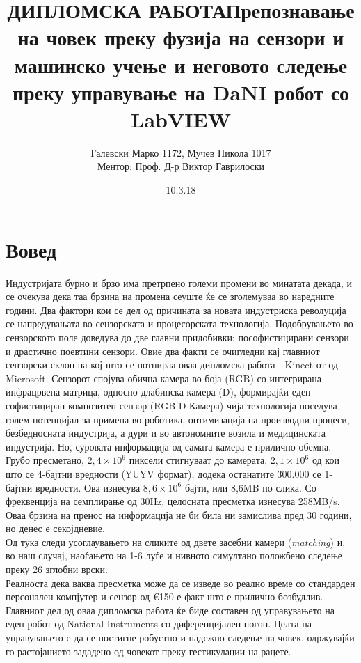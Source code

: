 \documentclass[12pt]{article}
\title{ДИПЛОМСКА РАБОТА\bigbreak \textbf{Препознавање на човек преку фузија на сензори и машинско учење и неговото следење
				преку управување на DaNI робот со LabVIEW}}
\date{10.3.18}
\author{Галевски Марко 1172, Мучев Никола 1017	\\	Ментор: Проф. Д-р Виктор Гаврилоски}
\begin{document}
    \sloppy
    \maketitle{}
    \newpage
    \tableofcontents
    \newpage
\section{Вовед}
  Индустријата бурно и брзо има претрпено големи промени во минатата декада, и се очекува дека таа брзина на промена сеуште ќе се зголемуваа во наредните години. Два фактори кои се дел од причината за новата индустриска револуција се напредувањата во сензорската и процесорската технологија.\bigbreak
  Подобрувањето во сензорското поле доведува до две главни придобивки: пософистицирани сензори и драстично поевтини сензори. Овие два факти се очигледни кај главниот сензорски склоп на кој што се потпираа оваа дипломска работа - Kinect-от од Microsoft. Сензорот спојува обична камера во боја (RGB) со интегрирана инфрацрвена матрица, односно длабинска камера (D), формирајќи еден софистициран композитен сензор (RGB-D Камера) чија технологија поседува голем потенцијал за примена во роботика, оптимизација на производни процеси, безбедносната индустрија, а дури и во автономните возила и медицинската индустрија.
  \bigbreak
  Но, суровата информација од самата камера е прилично обемна. Грубо пресметано, $2,4 \times 10^6$ пиксели стигнуваат до камерата, $2,1 \times 10^6$ од кои што се 4-бајтни вредности (YUYV формат), додека останатите 300.000 се 1-бајтни вредности. Ова изнесува $8,6 \times 10^6$ бајти, или 8,6MB по слика. Со фреквенција на семплирање од 30Hz, целосната пресметка изнесува 258МB/s. Оваа брзина на пренос на информација не би била ни замислива пред 30 години, но денес е секојдневие.
  \\
  Од тука следи усоглаувањето на сликите од двете засебни камери (\textit{matching}) и, во наш случај, наоѓањето на 1-6 луѓе и нивното симултано положбено следење преку 26 зглобни врски.
  \\
  Реалноста дека ваква пресметка може да се изведе во реално време со стандарден персонален компјутер и сензор од €150 е факт што е прилично бозбудлив.
  \bigbreak
  Главниот дел од оваа дипломска работа ќе биде составен од управувањето на еден робот од National Instruments со диференцијален погон. Целта на управувањето е да се постигне робустно и надежно следење на човек, одржувајќи го растојанието зададено од човекот преку гестикулации на рацете.
  \\
\end{document}

